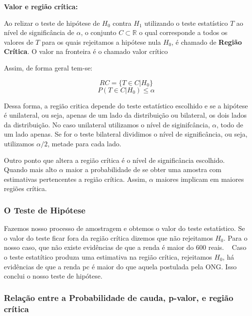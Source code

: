 \documentclass[
  letterpaper,
  DIV=11,
  numbers=noendperiod]{scrartcl}
\begin{document}
\begin{definicao}

\textbf{Valor e região crítica:}

Ao relizar o teste de hipótese de \(H_0\) contra \(H_1\) utilizando o
teste estatístico \(T\) ao nível de significância de \(\alpha\), o
conjunto \(C \subset \mathbb{R}\) o qual corresponde a todos os valores
de \(T\) para os quais rejeitamos a hipótese nula \(H_0\), é chamado de
\textbf{Região Crítica}. O valor na fronteira é o chamado valor crítico

\end{definicao}

Assim, de forma geral tem-se:

\[RC =\{T \in C| H_0\}\] \[P(T \in C|H_0)\leq\alpha\]

Dessa forma, a região critica depende do teste estatístico escolhido e
se a hipótese é unilateral, ou seja, apenas de um lado da distribuição
ou bilateral, os dois lados da distribuição. No caso unilateral
utilizamos o nível de siginifcância, \(\alpha\), todo de um lado apenas.
Se for o teste bilateral dividimos o nível de significância, ou seja,
utilizamos \(\alpha /2\), metade para cada lado.

Outro ponto que altera a região crítica é o nível de significância
escolhido. Quando mais alto \(\alpha\) maior a probabilidade de se obter
uma amostra com estimativas pertencentes a região crítica. Assim,
\(\alpha\) maiores implicam em maiores regiões crítica.

\subsubsection{O Teste de Hipótese}\label{o-teste-de-hipuxf3tese}

Fazemos nosso processo de amostragem e obtemos o valor do teste
estatístico. Se o valor do teste ficar fora da região crítica dizemos
que não rejeitamos \(H_0\). Para o nosso caso, que não existe evidências
de que a renda é maior do 600 reais. ~ Caso o teste estatítico produza
uma estimativa na região crítica, rejeitamos \(H_0\), há evidências de
que a renda pc é maior do que aquela postulada pela ONG. Isso conclui o
nosso teste de hipótese.

\subsubsection{Relação entre a Probabilidade de cauda, p-valor, e região
crítica}\label{relauxe7uxe3o-entre-a-probabilidade-de-cauda-p-valor-e-regiuxe3o-cruxedtica}
\end{document}
